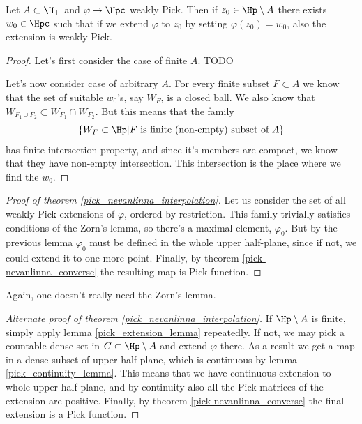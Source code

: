 \begin{lem}\label{pick_extension_lemma}
	Let $A \subset \H_{+}$ and $\varphi \to \Hpc$ weakly Pick. Then if $z_{0} \in \Hp \setminus A$ there exists $w_{0} \in \Hpc$ such that if we extend $\varphi$ to $z_{0}$ by setting $\varphi(z_{0}) = w_{0}$, also the extension is weakly Pick.
\end{lem}
\begin{proof}
	Let's first consider the case of finite $A$. TODO

	Let's now consider case of arbitrary $A$. For every finite subset $F \subset A$ we know that the set of suitable $w_{0}$'s, say $W_{F}$, is a closed ball. We also know that $W_{F_{1} \cup F_{2}} \subset W_{F_{1}} \cap W_{F_{2}}$. But this means that the family
	\begin{align*}
		\{W_{F} \subset \Hp | \text{$F$ is finite (non-empty) subset of $A$} \}
	\end{align*}
	has finite intersection property, and since it's members are compact, we know that they have non-empty intersection. This intersection is the place where we find the $w_{0}$.
\end{proof}

\begin{proof}[Proof of theorem \ref{pick_nevanlinna_interpolation}]
Let us consider the set of all weakly Pick extensions of $\varphi$, ordered by restriction. This family trivially satisfies conditions of the Zorn's lemma, so there's a maximal element, $\varphi_{0}$. But by the previous lemma $\varphi_{0}$ must be defined in the whole upper half-plane, since if not, we could extend it to one more point. Finally, by theorem \ref{pick-nevanlinna_converse} the resulting map is Pick function.
\end{proof}

Again, one doesn't really need the Zorn's lemma.

\begin{proof}[Alternate proof of theorem \ref{pick_nevanlinna_interpolation}]
	If $\Hp \setminus A$ is finite, simply apply lemma \ref{pick_extension_lemma} repeatedly. If not, we may pick a countable dense set in $C \subset \Hp \setminus A$ and extend $\varphi$ there. As a result we get a map in a dense subset of upper half-plane, which is continuous by lemma \ref{pick_continuity_lemma}. This means that we have continuous extension to whole upper half-plane, and by continuity also all the Pick matrices of the extension are positive. Finally, by theorem \ref{pick-nevanlinna_converse} the final extension is a Pick function.
\end{proof}

